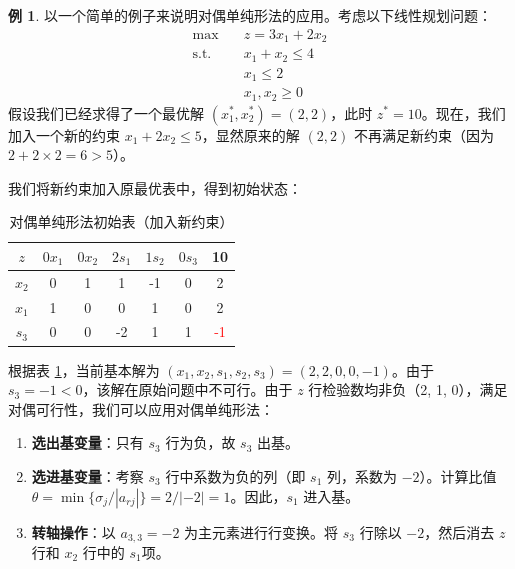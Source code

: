\documentclass[12pt]{article}
\theoremstyle{plain}
\theoremstyle{definition}
\newtheorem{exm}{例}[subsection]
\newcommand{\st}{\mathrel{\text{s.t.}}}
\begin{document}
\begin{exm}
    以一个简单的例子来说明对偶单纯形法的应用。考虑以下线性规划问题：
    \begin{align*}
        \max \quad & z = 3x_1 + 2x_2 \\
        \st \quad & x_1 + x_2 \leq 4 \\
        & x_1 \leq 2 \\
        & x_1, x_2 \geq 0
    \end{align*}
    假设我们已经求得了一个最优解 $(x_1^*, x_2^*) = (2, 2)$，此时 $z^* = 10$。现在，我们加入一个新的约束 $x_1 + 2x_2 \leq 5$，显然原来的解 $(2, 2)$ 不再满足新约束（因为 $2 + 2 \times 2 = 6 > 5$）。
    
    我们将新约束加入原最优表中，得到初始状态：
    \begin{table}[!htbp]
        \centering
        \caption{对偶单纯形法初始表（加入新约束）}
        \label{tab:dual_simplex_initial}
        \begin{tabular}{c|ccccc|c}
            \hline
            $z$ & $0x_1$ & $0x_2$ & $2s_1$ & $1s_2$ & $0s_3$ & 10 \\
            \hline
            $x_2$ & 0 & 1 & 1 & -1 & 0 & 2 \\
            $x_1$ & 1 & 0 & 0 & 1 & 0 & 2 \\
            $s_3$ & 0 & 0 & -2 & 1 & 1 & \textcolor{red}{-1} \\
            \hline
        \end{tabular}
    \end{table}

    根据表 \ref{tab:dual_simplex_initial}，当前基本解为 $(x_1, x_2, s_1, s_2, s_3) = (2, 2, 0, 0, -1)$。由于 $s_3 = -1 < 0$，该解在原始问题中不可行。由于 $z$ 行检验数均非负（2, 1, 0），满足对偶可行性，我们可以应用对偶单纯形法：

    \begin{enumerate}
        \item \textbf{选出基变量}：只有 $s_3$ 行为负，故 $s_3$ 出基。
        \item \textbf{选进基变量}：考察 $s_3$ 行中系数为负的列（即 $s_1$ 列，系数为 $-2$）。计算比值 $\theta = \min \{ \sigma_j / |a_{rj}| \} = 2 / |-2| = 1$。因此，$s_1$ 进入基。
        \item \textbf{转轴操作}：以 $a_{3,3} = -2$ 为主元素进行行变换。将 $s_3$ 行除以 $-2$，然后消去 $z$ 行和 $x_2$ 行中的 $s_1$项。
    \end{enumerate}


\end{exm}
\end{document}
